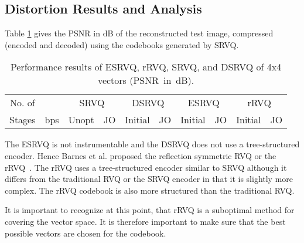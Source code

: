 \subsection {Distortion Results and Analysis}
Table \ref{table:dist4x4} gives the PSNR in dB of the reconstructed test image,
compressed (encoded and decoded) using the codebooks generated by SRVQ. 

\begin{table}[!t] %
  \renewcommand{\arraystretch}{1.3}
  \caption{Performance results of ESRVQ, rRVQ, SRVQ, and DSRVQ of 4x4
    vectors (PSNR~in~dB).}
  \label{table:dist4x4}

  \centering
  \begin{tabular}{||c|c||c|c||c|c||c|c||c|c||} \hline
    No. of  & &
    \multicolumn{2}{c||}{SRVQ} & \multicolumn{2}{c||}{DSRVQ} &
    \multicolumn{2}{c||}{ESRVQ} & \multicolumn{2}{c||}{rRVQ} \\ \cline{3-10}
    Stages & bps & Unopt & JO & Initial & JO & Initial & JO & Initial & JO \\ \hline
  \end{tabular}
\end{table}

The ESRVQ is not instrumentable and the DSRVQ does not use a
tree-structured encoder.  Hence Barnes et al. proposed the reflection
symmetric RVQ or the rRVQ~\cite{Barn-JORVQ}.  The rRVQ uses a
tree-structured encoder similar to SRVQ although it differs from the
traditional RVQ or the SRVQ encoder in that it is slightly more
complex.  The rRVQ codebook is also more structured than the
traditional RVQ.

It is important to recognize at this point, that rRVQ is a suboptimal
method for covering the vector space.  It is therefore important to
make sure that the best possible vectors are chosen for the codebook.

% 

